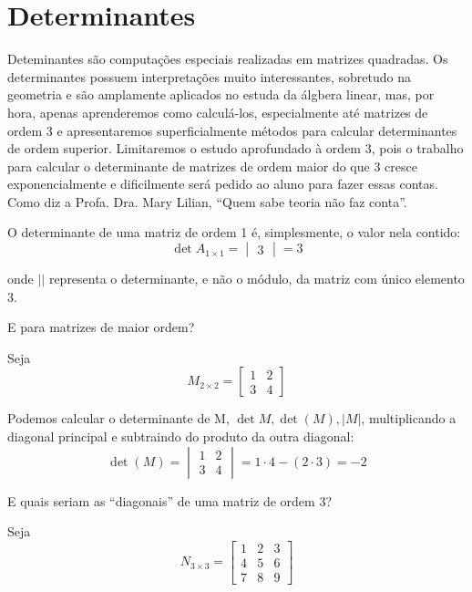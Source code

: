 \documentclass[
  letterpaper,
  DIV=11,
  numbers=noendperiod]{scrreprt}
\begin{document}
\section{Determinantes}\label{determinantes}

Deteminantes são computações especiais realizadas em matrizes quadradas.
Os determinantes possuem interpretações muito interessantes, sobretudo
na geometria e são amplamente aplicados no estuda da álgbera linear,
mas, por hora, apenas aprenderemos como calculá-los, especialmente até
matrizes de ordem 3 e apresentaremos superficialmente métodos para
calcular determinantes de ordem superior. Limitaremos o estudo
aprofundado à ordem 3, pois o trabalho para calcular o determinante de
matrizes de ordem maior do que 3 cresce exponencialmente e dificilmente
será pedido ao aluno para fazer essas contas. Como diz a Profa. Dra.
Mary Lilian, ``Quem sabe teoria não faz conta''.

O determinante de uma matriz de ordem 1 é, simplesmente, o valor nela
contido: \[
\det{A_{1\times1}}=
\begin{vmatrix}
    3
\end{vmatrix} = 3
\]

onde \(||\) representa o determinante, e não o módulo, da matriz com
único elemento 3.

E para matrizes de maior ordem?

Seja \[
M_{2\times2} =
\begin{bmatrix}
    1 & 2\\
    3 & 4 
\end{bmatrix}
\]

Podemos calcular o determinante de M, \(\det{M},\det{(M)}, |M|\),
multiplicando a diagonal principal e subtraindo do produto da outra
diagonal: \[
\det{(M)}=\begin{vmatrix}
    1 & 2\\
    3 & 4 
\end{vmatrix} = 1 \cdot 4 - (2 \cdot 3) = -2
\]

E quais seriam as ``diagonais'' de uma matriz de ordem 3?

Seja \[
N_{3\times3} =
\begin{bmatrix}
    1 & 2 & 3\\
    4 & 5 & 6\\
    7 & 8 & 9
\end{bmatrix}
\]
\end{document}
